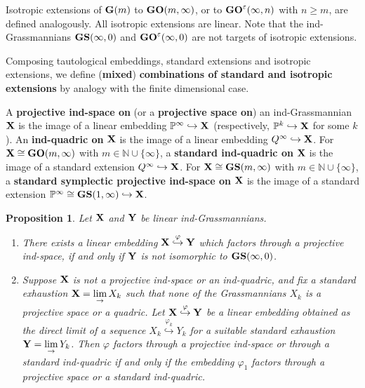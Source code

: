 \documentclass[12pt]{amsart}
\def\NN {{\mathbb N}}     %
\def\PP {{\mathbb P}}     %
\def\eps {\varepsilon}
\def\hw  {\hookrightarrow}
\newtheorem{prop}[theorem]{Proposition}
\begin{document}
Isotropic extensions of ${\bf G}(m)$ to ${\bf GO}(m,\infty)$, or to ${\bf GO}^\eps(\infty,n)$ with $n\geq m$, are defined analogously. All isotropic extensions are linear. Note that the ind-Grassmannians ${\bf GS}(\infty,0)$ and ${\bf GO}^\eps(\infty,0)$ are not targets of isotropic extensions.

Composing tautological embeddings, standard extensions and isotropic extensions, we define ({\bf mixed}) {\bf combinations of standard and isotropic extensions} by analogy with the finite dimensional case.

A {\bf projective ind-space on} (or a {\bf projective space on}) an ind-Grassmannian ${\bf X}$ is the image of a linear embedding $\PP^\infty\hookrightarrow{\bf X}$ (respectively, $\PP^k\hw{\bf X}$ for some $k$). An {\bf ind-quadric on} ${\bf X}$ is the image of a linear embedding $Q^\infty\hookrightarrow {\bf X}$. For ${\bf X}\cong {\bf GO}(m,\infty)$ with $m\in\NN\cup\{\infty\}$, a {\bf standard ind-quadric on} ${\bf X}$ is the image of a standard extension $Q^\infty\hookrightarrow {\bf X}$. For ${\bf X}\cong {\bf GS}(m,\infty)$ with $m\in\NN\cup\{\infty\}$, a {\bf standard symplectic projective ind-space on} ${\bf X}$ is the image of a standard extension $\PP^\infty\cong {\bf GS}(1,\infty)\hookrightarrow {\bf X}$.


\begin{prop}
Let ${\bf X}$ and ${\bf Y}$ be linear ind-Grassmannians.
\begin{enumerate}
\item[{\rm (i)}] There exists a linear embedding ${\bf X}\stackrel{\varphi}{\hookrightarrow}{\bf Y}$ which factors through a projective ind-space, if and only if ${\bf Y}$ is not isomorphic to ${\bf GS}(\infty,0)$.
\item[{\rm (ii)}] Suppose ${\bf X}$ is not a projective ind-space or an ind-quadric, and fix a standard exhaustion ${\bf X}=\lim\limits_\to X_k$ such that none of the Grassmannians $X_k$ is a projective space or a quadric. Let ${\bf X}\stackrel{\varphi}{\hookrightarrow}{\bf Y}$ be a linear embedding obtained as the direct limit of a sequence $X_k\stackrel{\varphi_k}{\hookrightarrow} Y_k$ for a suitable standard exhaustion ${\bf Y}=\lim\limits_\to Y_k$. Then $\varphi$ factors through a projective ind-space or through a standard ind-quadric if and only if the embedding $\varphi_1$ factors through a projective space or a standard ind-quadric.
\end{enumerate}
\end{prop}
\end{document}
